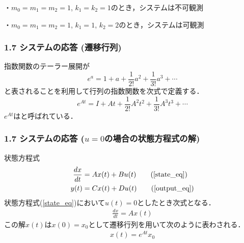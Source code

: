 \begin{frame}[t]
・$m_0=m_1=m_2=1$, $k_1=k_2=1$のとき，システムは不可観測

・$m_0=m_1=m_2=1$, $k_1=1$, $k_2=2$のとき，システムは可観測
\end{frame}


\begin{frame}[t]
\frametitle{1.7 システムの応答 (遷移行列)}
指数関数のテーラー展開が
\begin{equation}
  e^{a} = 1 + a + \frac{1}{2!} a^2
        + \frac{1}{3!} a^3  + \cdots
\end{equation}
と表されることを利用して行列の指数関数を次式で定義する．
\begin{equation}
 e^{At} = I + At + \frac{1}{2!} A^2 t^2
        + \frac{1}{3!} A^3 t^3 + \cdots
\end{equation}
$e^{At}$はと呼ばれている．
\end{frame}


\begin{frame}[t]
\frametitle{1.7 システムの応答 ($u=0$の場合の状態方程式の解)}
状態方程式
\begin{align}
   \frac{dx}{dt} &= A x(t) + B u(t) \tag{\ref{state_eq}} \\
   y(t) &= C x(t) + D u(t) \tag{\ref{output_eq}}
\end{align}
状態方程式(\ref{state_eq})において$u(t) = 0$としたとき次式となる．
\begin{align}
\frac{dx}{dt} = Ax(t) \label{autonomous}
\end{align}
この解$x(t)$は$x(0)=x_0$として遷移行列を用いて次のように表わされる．
\begin{align}
 x(t) = e^{At} x_0 \label{eat}
\end{align}
\end{frame}


